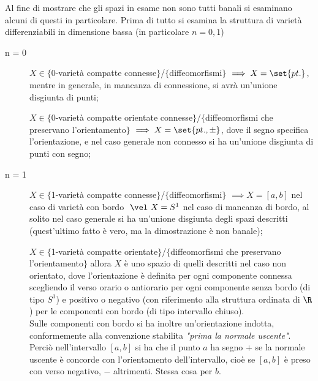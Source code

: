 
Al fine di mostrare che gli spazi in esame non sono tutti banali si esaminano alcuni di questi in particolare.
Prima di tutto si esamina la struttura di varietà differenziabili in dimensione bassa (in particolare $n = 0, 1$)
\begin{description}
\item [n = 0] $X \in \{$0-varietà compatte connesse$\}$/$\{$diffeomorfismi$\}$ $\implies X = \set{pt.}$, mentre in generale, in mancanza di connessione, si avrà un'unione disgiunta di punti;

$X \in \{$0-varietà compatte orientate connesse$\}$/$\{$diffeomorfismi che preservano l'orientamento$\}$ $\implies X = \set{pt., \pm}$, dove il segno specifica l'orientazione, e nel caso generale non connesso si ha un'unione disgiunta di punti con segno;
\item [n = 1] $X \in \{$1-varietà compatte connesse$\}$/$\{$diffeomorfismi$\}$ $\implies X = [a,b]$ nel caso di varietà con bordo $~\vel~ X = S^1$ nel caso di mancanza di bordo, al solito nel caso generale si ha un'unione disgiunta degli spazi descritti (quest'ultimo fatto è vero, ma la dimostrazione è non banale);

$X \in \{$1-varietà compatte orientate$\}$/$\{$diffeomorfismi che preservano l'orientamento$\}$ allora $X$ è uno spazio di quelli descritti nel caso non orientato, dove l'orientazione è definita per ogni componente connessa scegliendo il verso orario o antiorario per ogni componente senza bordo (di tipo $S^1$) e positivo o negativo (con riferimento alla struttura ordinata di $\R$) per le componenti con bordo (di tipo intervallo chiuso).\\
Sulle componenti con bordo si ha inoltre un'orientazione indotta, conformemente alla convenzione stabilita \emph{"prima la normale uscente"}. Perciò nell'intervallo $[a,b]$ si ha che il punto $a$ ha segno $+$ se la normale uscente è concorde con l'orientamento dell'intervallo, cioè se $[a,b]$ è preso con verso negativo, $-$ altrimenti. Stessa cosa per $b$.
\end{description}

